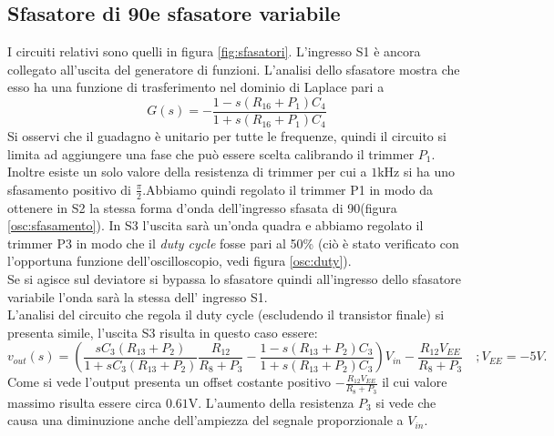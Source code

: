 \documentclass[10pt,a4paper]{article}
\begin{document}
\subsection{Sfasatore di 90\degree e sfasatore variabile}
I circuiti relativi sono quelli in figura \ref{fig:sfasatori}. L'ingresso S1 è ancora collegato all'uscita del generatore di funzioni.
L'analisi dello sfasatore mostra che esso ha una funzione di trasferimento nel dominio di Laplace pari a
\begin{equation}
 G(s) = -\frac{1-s(R_{16} +P_1) C_{4}}{1+s(R_{16} + P_1)C_{4}}
\end{equation}
Si osservi che il guadagno è unitario per tutte le frequenze, quindi il circuito si limita ad aggiungere una fase che può essere scelta calibrando il trimmer $P_1$. Inoltre esiste un solo valore della resistenza di trimmer per cui a $1$kHz si ha uno sfasamento positivo di $\frac{\pi}{2}$.Abbiamo quindi regolato il trimmer P1 in modo da ottenere in S2 la stessa forma d'onda dell'ingresso sfasata di 90\degree (figura \ref{osc:sfasamento}). In S3 l'uscita sarà un'onda quadra e abbiamo regolato il trimmer P3 in modo che il \emph{duty cycle} fosse pari al 50\% (ciò è stato verificato con l'opportuna funzione dell'oscilloscopio, vedi figura \ref{osc:duty}).\\ Se si agisce sul deviatore si bypassa lo sfasatore quindi all'ingresso dello sfasatore variabile l'onda sarà la stessa dell' ingresso S1.\\
L'analisi del circuito che regola il duty cycle (escludendo il transistor finale) si presenta simile, l'uscita S3 risulta in questo caso essere:
\begin{equation}
v_{out}(s) = \left( \frac{s C_3 (R_{13} + P_2)}{1 + s C_3 (R_{13} + P_2)} \frac{R_{12}}{R_8+P_3} -\frac{1-s(R_{13} +P_2) C_{3}}{1+s(R_{13} + P_2)C_{3}} \right) V_{in}-\frac{R_{12} V_{EE}}{R_8+P_3}
\, \, \, \, \, \, ; V_{EE} = -5V.
\end{equation}
Come si vede l'output presenta un offset costante positivo $-\frac{R_{12} V_{EE}}{R_8+P_3}$ il cui valore massimo risulta essere circa $0.61$V. L'aumento della resistenza $P_3$ si vede che causa una diminuzione anche dell'ampiezza del segnale proporzionale a $V_{in}$. 

\end{document}
